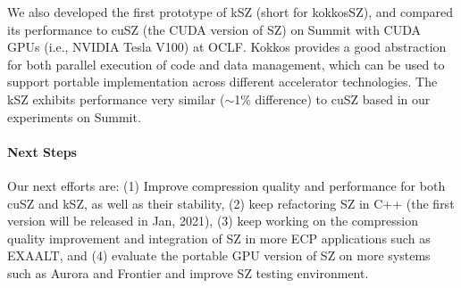 We also developed the first prototype of kSZ (short for kokkosSZ), and compared its performance to cuSZ (the CUDA version of SZ) on Summit with CUDA GPUs (i.e., NVIDIA Tesla V100) at OCLF. Kokkos provides a good abstraction for both parallel execution of code and data management, which can be used to support portable implementation across different accelerator technologies. The kSZ exhibits performance very similar ($\sim$1\% difference) to cuSZ based in our experiments on Summit.


\paragraph{Next Steps} Our next efforts are: (1) Improve compression quality and performance for both cuSZ and kSZ, as well as their stability, (2) keep refactoring SZ in C++ (the first version will be released in Jan, 2021), (3) keep working on the compression quality improvement and integration of SZ in more ECP applications such as EXAALT, and (4) evaluate the portable GPU version of SZ on more systems such as Aurora and Frontier and improve SZ testing environment.

